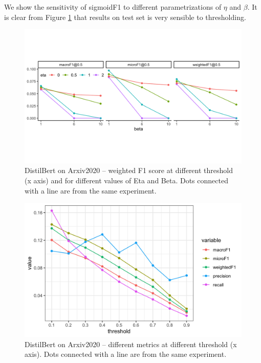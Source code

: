 We show the sensitivity of sigmoidF1 to different parametrizations of $\eta$ and $\beta$. It is clear from Figure \ref{fig:betaEta} that results on test set is very sensible to thresholding.



\begin{figure}[htbp]
\centering
\includegraphics[width=.9\linewidth]{./images/betaEta.png}
\caption{\label{fig:betaEta}
DistilBert on Arxiv2020 – weighted F1 score at different threshold (x axis) and for different values of Eta and Beta. Dots connected with a line are from the same experiment.}
\end{figure}


\begin{figure}[htbp]
\centering
\includegraphics[width=.9\linewidth]{./images/thresh.png}
\caption{\label{fig:thresh}
DistilBert on Arxiv2020 – different metrics at different threshold (x axis). Dots connected with a line are from the same experiment.}
\end{figure}

